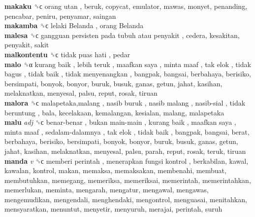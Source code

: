 \textbf{makaku} ␝ϲ   orang utan , beruk, copycat, emulator, mawas, monyet, penanding, pencabar, peniru, penyamar, saingan  \\
\textbf{makamba} ␝ϲ   lelaki Belanda ,  orang Belanda   \\
\textbf{malesa} ␝ϲ   gangguan persisten pada tubuh atau penyakit , cedera, kesakitan, penyakit, sakit  \\
\textbf{malkontentu} ␝ϲ   tidak puas hati , pedar  \\
\textbf{malo} ␝α   kurang baik ,  lebih teruk ,  maafkan saya ,  minta maaf ,  tak elok ,  tidak bagus ,  tidak baik ,  tidak menyenangkan , bangpak, bangsai, berbahaya, berisiko, bersimpati, bonyok, bonyor, buruk, busuk, ganas, getun, jahat, kasihan, melaknatkan, menyesal, palsu, reput, rosak, tiruan  \\
\textbf{malora} ␝ϲ   malapetaka,malang ,  nasib buruk ,  nasib malang ,  nasib-sial ,  tidak beruntung , bala, kecelakaan, kemalangan, kesialan, malang, malapetaka  \\
\textbf{malu} \emph{adj}  ␝ϲ   benar-benar ,  bukan main-main ,  kurang baik ,  maafkan saya ,  minta maaf ,  sedalam-dalamnya ,  tak elok ,  tidak baik , bangpak, bangsai, berat, berbahaya, berisiko, bersimpati, bonyok, bonyor, buruk, busuk, ganas, getun, jahat, kasihan, melaknatkan, menyesal, palsu, parah, reput, rosak, teruk, tiruan  \\
\textbf{manda} \emph{v}  ␝ϲ   memberi perintah ,  menerapkan fungsi kontrol , berkabilan, kawal, kawalan, kontrol, makan, memaksa, memaksakan, membenahi, membuat, membutuhkan, memegang, memeriksa, memeriksai, memerintah, memerintahkan, memerlukan, meminta, mengarah, mengatur, mengawal, mengawas, mengemudikan, mengendali, menghendaki, mengontrol, menguasai, menitahkan, mensyaratkan, menuntut, menyetir, menyuruh, merajai, perintah, suruh  \\
